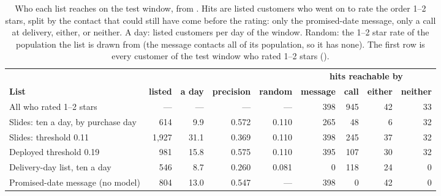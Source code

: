 \begin{table}[htbp]
\centering
\caption{Who each list reaches on the test window, from
. Hits are listed customers who went on to rate
the order 1--2 stars, split by the contact that could still have come before the
rating: only the promised-date message, only a call at delivery, either, or
neither. A day: listed customers per day of the window. Random: the 1--2 star
rate of the population the list is drawn from (the message contacts all of its
population, so it has none). The first row is every customer of the test window
who rated 1--2 stars ().}
\label{tab:reach}
\footnotesize
\setlength{\tabcolsep}{3.5pt}
\begin{tabular}{@{}p{4.3cm}rrrrrrrr@{}}
\toprule
 & & & & & \multicolumn{4}{c}{\textbf{hits reachable by}} \\
\cmidrule(l){6-9}
\textbf{List} & \textbf{listed} & \textbf{a day} & \textbf{precision} &
\textbf{random} & \textbf{message} & \textbf{call} & \textbf{either} &
\textbf{neither} \\
\midrule
All who rated 1--2 stars & --- & --- & --- & --- & 398 & 945 & 42 & 33 \\
\midrule
Slides: ten a day, by purchase day & 614 & 9.9 & 0.572 & 0.110 & 265 & 48 & 6 & 32 \\
Slides: threshold 0.11 & 1{,}927 & 31.1 & 0.369 & 0.110 & 398 & 245 & 37 & 32 \\
Deployed threshold 0.19 & 981 & 15.8 & 0.575 & 0.110 & 395 & 107 & 30 & 32 \\
Delivery-day list, ten a day & 546 & 8.7 & 0.260 & 0.081 & 0 & 118 & 24 & 0 \\
Promised-date message (no model) & 804 & 13.0 & 0.547 & --- & 398 & 0 & 42 & 0 \\
\bottomrule
\end{tabular}
\end{table}

